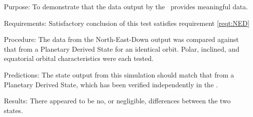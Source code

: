 \begin{description}
\item{Purpose:}\newline
To demonstrate that the data output by the \NEDDesc\ provides meaningful data.

\item{Requirements:}\newline
Satisfactory conclusion of this test satisfies requirement \ref{reqt:NED}

\item{Procedure:}\newline
The data from the North-East-Down output was compared against that from a Planetary Derived State for an identical orbit.  Polar, inclined, and equatorial orbital characteristics were each tested.

\item{Predictions:}
The state output from this simulation should match that from a Planetary Derived State, which has been verified independently in the .

\item{Results:}
There appeared to be no, or negligible, differences between the two states. 
\end{description}



